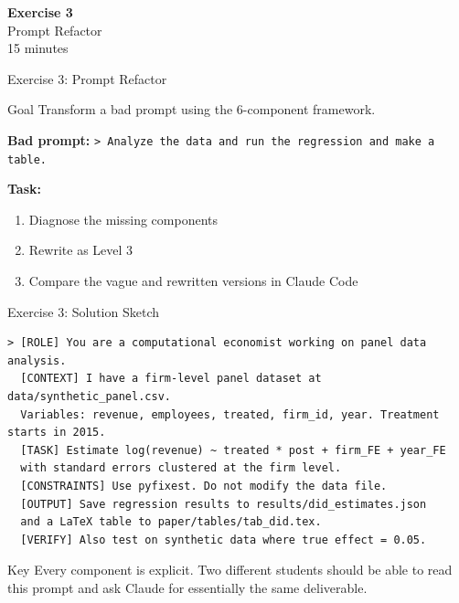 \documentclass[aspectratio=169,10pt]{beamer}
\begin{document}
\begin{frame}{}
\vfill\begin{center}{\Huge \textcolor{uzhblue}{\textbf{Exercise 3}}}\\[12pt]
{\LARGE Prompt Refactor}\\[6pt]{\small 15 minutes}\end{center}\vfill
\end{frame}

\begin{frame}[fragile]{Exercise 3: Prompt Refactor}
\begin{exampleblock}{Goal}
Transform a bad prompt using the 6-component framework.
\end{exampleblock}
\small
\textbf{Bad prompt:} \texttt{> Analyze the data and run the regression and make a table.}

\vspace{0.3em}
\textbf{Task:}
\begin{enumerate}\itemsep1pt
    \item Diagnose the missing components
    \item Rewrite as Level 3
    \item Compare the vague and rewritten versions in Claude Code
\end{enumerate}
\end{frame}

\begin{frame}[fragile]{Exercise 3: Solution Sketch}
\scriptsize
\begin{lstlisting}[style=prompt, basicstyle=\tiny\ttfamily]
> [ROLE] You are a computational economist working on panel data analysis.
  [CONTEXT] I have a firm-level panel dataset at data/synthetic_panel.csv.
  Variables: revenue, employees, treated, firm_id, year. Treatment starts in 2015.
  [TASK] Estimate log(revenue) ~ treated * post + firm_FE + year_FE
  with standard errors clustered at the firm level.
  [CONSTRAINTS] Use pyfixest. Do not modify the data file.
  [OUTPUT] Save regression results to results/did_estimates.json
  and a LaTeX table to paper/tables/tab_did.tex.
  [VERIFY] Also test on synthetic data where true effect = 0.05.
\end{lstlisting}

\begin{block}{Key}
Every component is explicit. Two different students should be able to read this
prompt and ask Claude for essentially the same deliverable.
\end{block}
\end{frame}
\end{document}
